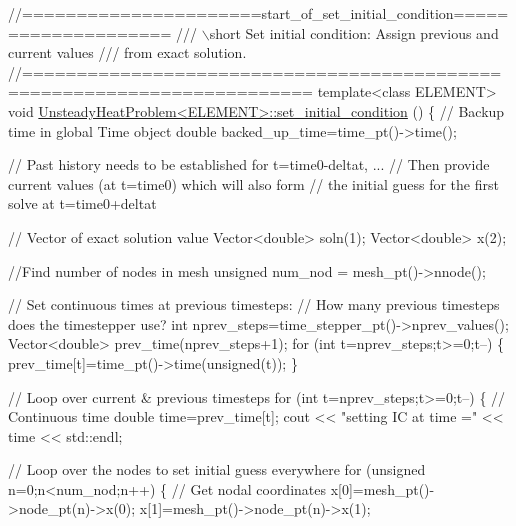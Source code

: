 \begin{DoxyCodeInclude}
\textcolor{comment}{//======================start\_of\_set\_initial\_condition====================}
\textcolor{comment}{/// \(\backslash\)short Set initial condition: Assign previous and current values}
\textcolor{comment}{}\textcolor{comment}{/// from exact solution.}
\textcolor{comment}{}\textcolor{comment}{//========================================================================}
\textcolor{keyword}{template}<\textcolor{keyword}{class} ELEMENT>
\textcolor{keywordtype}{void} \hyperlink{classUnsteadyHeatProblem_a98de3ed2d9cf5409323121bbb482bc1b}{UnsteadyHeatProblem<ELEMENT>::set\_initial\_condition}
      ()
\{ 
 \textcolor{comment}{// Backup time in global Time object}
 \textcolor{keywordtype}{double} backed\_up\_time=time\_pt()->time();
         
 \textcolor{comment}{// Past history needs to be established for t=time0-deltat, ...}
 \textcolor{comment}{// Then provide current values (at t=time0) which will also form}
 \textcolor{comment}{// the initial guess for the first solve at t=time0+deltat}
 
 \textcolor{comment}{// Vector of exact solution value}
 Vector<double> soln(1);
 Vector<double> x(2);

 \textcolor{comment}{//Find number of nodes in mesh}
 \textcolor{keywordtype}{unsigned} num\_nod = mesh\_pt()->nnode();

 \textcolor{comment}{// Set continuous times at previous timesteps:}
 \textcolor{comment}{// How many previous timesteps does the timestepper use?}
 \textcolor{keywordtype}{int} nprev\_steps=time\_stepper\_pt()->nprev\_values();
 Vector<double> prev\_time(nprev\_steps+1);
 \textcolor{keywordflow}{for} (\textcolor{keywordtype}{int} t=nprev\_steps;t>=0;t--)
  \{
   prev\_time[t]=time\_pt()->time(\textcolor{keywordtype}{unsigned}(t));
  \} 

 \textcolor{comment}{// Loop over current & previous timesteps}
 \textcolor{keywordflow}{for} (\textcolor{keywordtype}{int} t=nprev\_steps;t>=0;t--)
  \{
   \textcolor{comment}{// Continuous time}
   \textcolor{keywordtype}{double} time=prev\_time[t];
   cout << \textcolor{stringliteral}{"setting IC at time ="} << time << std::endl;
   
   \textcolor{comment}{// Loop over the nodes to set initial guess everywhere}
   \textcolor{keywordflow}{for} (\textcolor{keywordtype}{unsigned} n=0;n<num\_nod;n++)
    \{
     \textcolor{comment}{// Get nodal coordinates}
     x[0]=mesh\_pt()->node\_pt(n)->x(0);
     x[1]=mesh\_pt()->node\_pt(n)->x(1);


\end{DoxyCodeInclude}
